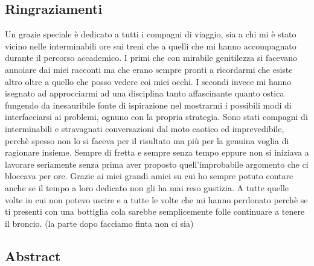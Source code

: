 \documentclass[12pt,a4paper]{book}
\begin{document}
	\tableofcontents  %
	
	\subsection*{Ringraziamenti}
	Un grazie speciale è dedicato a tutti i compagni di viaggio, sia a chi mi è stato vicino nelle interminabili ore sui treni che a quelli che mi hanno accompagnato durante il percorso accademico. I primi che con mirabile genitilezza si facevano annoiare dai miei racconti ma che erano sempre pronti a ricordarmi che esiste altro oltre a quello che posso vedere coi miei occhi. I secondi invece mi hanno isegnato ad approcciarmi ad una disciplina tanto affascinante quanto ostica fungendo da inesauribile fonte di ispirazione nel mostrarmi i possibili modi di interfacciarsi ai problemi, ognuno con la propria strategia. Sono stati compagni di interminabili e stravagnati conversazioni dal moto caotico ed imprevedibile, perchè spesso non lo si faceva per il risultato ma più per la genuina voglia di ragionare insieme. Sempre di fretta e sempre senza tempo eppure non si iniziava a lavorare seriamente senza prima aver proposto quell'improbabile argomento che ci bloccava per ore. Grazie ai miei grandi amici su cui ho sempre potuto contare anche se il tempo a loro dedicato non gli ha mai reso gustizia. A tutte quelle volte in cui non potevo uscire e a tutte le volte che mi hanno perdonato perchè se ti presenti con una bottiglia cola sarebbe semplicemente folle continuare a tenere il broncio. (la parte dopo facciamo finta non ci sia)%
	
	\newpage
	\subsection*{Abstract}
	
\end{document}
